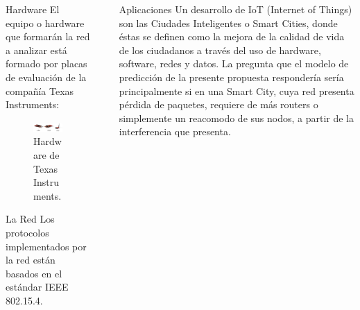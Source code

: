 \documentclass[final]{beamer}
\newlength{\sepwidthB}
\newlength{\colwidthB}
\newcommand{\separatorcolumnB}{\begin{column}{\sepwidthB}\end{column}}
\begin{document}
\begin{frame}[t]
\begin{columns}
\begin{column}[T]{\colwidthB}
    \begin{block}{Hardware}
        El equipo o hardware que formarán la red a analizar está formado por placas de evaluación de la compañía Texas Instruments:

        \begin{figure}[!Ht]
            \centering
                \includegraphics[width=\linewidth]{Figures/hardware.png}
                \caption{Hardware de Texas Instruments.}
                \label{fig:hw}
        \end{figure}
    \end{block}

    \begin{alertblock}{La Red}
        Los protocolos implementados por la red están basados en el estándar IEEE 802.15.4.
    \end{alertblock}
        
\end{column}
\separatorcolumnB
\begin{column}[T]{\colwidthB}

    \begin{block}{Aplicaciones}
    Un desarrollo de IoT (Internet of Things) son las Ciudades Inteligentes o Smart Cities, donde éstas se definen como la mejora de la calidad de vida de los ciudadanos a través del uso de hardware, software, redes y datos. La pregunta que el modelo de predicción de la presente propuesta respondería sería principalmente si en una Smart City, cuya red presenta pérdida de paquetes, requiere de más routers o simplemente un reacomodo de sus nodos, a partir de la interferencia que presenta.


\end{block}
\end{column}
\end{columns}
\end{frame}
\end{document}
